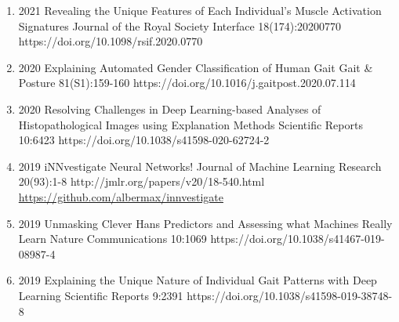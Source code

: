 \documentclass[10pt,a4paper]{article} %
\begin{document}
{\begin{enumerate}
    \item {}
                        {2021}
                        {Revealing the Unique Features of Each Individual's Muscle Activation Signatures}
                        {Journal of the Royal Society Interface}
                        {18(174):20200770}
                        {https://doi.org/10.1098/rsif.2020.0770}

    \item {}
                        {2020}
                        {Explaining Automated Gender Classification of Human Gait}
                        {Gait \& Posture}
                        {81(S1):159-160}
                        {https://doi.org/10.1016/j.gaitpost.2020.07.114}

    \item {}
                        {2020}
                        {Resolving Challenges in Deep Learning-based Analyses of Histopathological Images using Explanation Methods}
                        {Scientific Reports}
                        {10:6423}
                        {https://doi.org/10.1038/s41598-020-62724-2}

    \item {}
                        {2019}
                        {iNNvestigate Neural Networks!}
                        {Journal of Machine Learning Research}
                        {20(93):1-8}
                        {http://jmlr.org/papers/v20/18-540.html}
                        {\href{https://github.com/albermax/innvestigate}{https://github.com/albermax/innvestigate}}

    \item {}
                        {2019}
                        {Unmasking Clever Hans Predictors and Assessing what Machines Really Learn}
                        {Nature Communications}
                        {10:1069}
                        {https://doi.org/10.1038/s41467-019-08987-4}

    \item {}
                        {2019}
                        {Explaining the Unique Nature of Individual Gait Patterns with Deep Learning}
                        {Scientific Reports}
                        {9:2391}
                        {https://doi.org/10.1038/s41598-019-38748-8}


\end{enumerate}}
\end{document}
